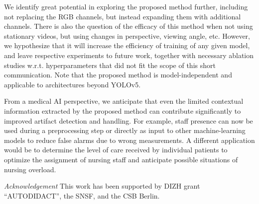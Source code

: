 \documentclass[conference]{IEEEtran}
\begin{document}
We identify great potential in exploring the proposed method further, including not replacing the RGB channels, but instead expanding them with additional channels.
There is also the question of the efficacy of this method when not using stationary videos, but using changes in perspective, viewing angle, etc.
However, we hypothesize that it will increase the efficiency of training of any given model, and leave respective experiments to future work, together with necessary ablation studies w.r.t. hyperparameters that did not fit the scope of this short communication.
Note that the proposed method is model-independent and applicable to architectures beyond YOLOv5.

From a medical AI perspective, we anticipate that even the limited contextual information extracted by the proposed method can contribute significantly to improved artifact detection and handling.
For example, staff presence can now be used during a preprocessing step or directly as input to other machine-learning models to reduce false alarms due to wrong measurements.
A different application would be to determine the level of care received by individual patients to optimize the assignment of nursing staff and anticipate possible situations of nursing overload.

\noindent\textit{Acknowledgement} This work has been supported by DIZH grant ``AUTODIDACT'', the SNSF, and the CSB Berlin.



\end{document}
